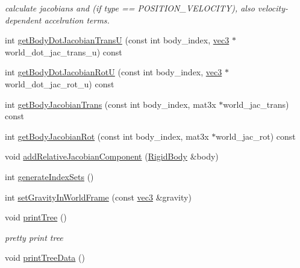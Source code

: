 \begin{CompactItemize}
\begin{CompactList}\small\item\em calculate jacobians and (if type == POSITION\_\-VELOCITY), also velocity-dependent accelration terms. \item\end{CompactList}\item 
int \hyperlink{classbt_inverse_dynamics_1_1_multi_body_tree_1_1_multi_body_impl_3121da37900effff77e309b2c5a2cd16}{getBodyDotJacobianTransU} (const int body\_\-index, \hyperlink{classbt_inverse_dynamics_1_1vec3}{vec3} $\ast$world\_\-dot\_\-jac\_\-trans\_\-u) const 
\item 
int \hyperlink{classbt_inverse_dynamics_1_1_multi_body_tree_1_1_multi_body_impl_dd377929159d3005cb80eb694ebed57e}{getBodyDotJacobianRotU} (const int body\_\-index, \hyperlink{classbt_inverse_dynamics_1_1vec3}{vec3} $\ast$world\_\-dot\_\-jac\_\-rot\_\-u) const 
\item 
int \hyperlink{classbt_inverse_dynamics_1_1_multi_body_tree_1_1_multi_body_impl_de8deee754a4e09bd652920a4e63875c}{getBodyJacobianTrans} (const int body\_\-index, mat3x $\ast$world\_\-jac\_\-trans) const 
\item 
int \hyperlink{classbt_inverse_dynamics_1_1_multi_body_tree_1_1_multi_body_impl_6ad506d2cc78d6184decd005bdabdce7}{getBodyJacobianRot} (const int body\_\-index, mat3x $\ast$world\_\-jac\_\-rot) const 
\item 
void \hyperlink{classbt_inverse_dynamics_1_1_multi_body_tree_1_1_multi_body_impl_6facecec947e6b43378ba20e6b98eea7}{addRelativeJacobianComponent} (\hyperlink{structbt_inverse_dynamics_1_1_rigid_body}{RigidBody} \&body)
\item 
int \hyperlink{classbt_inverse_dynamics_1_1_multi_body_tree_1_1_multi_body_impl_8e65f0c1da65e68e3a482862f3b866c7}{generateIndexSets} ()
\item 
int \hyperlink{classbt_inverse_dynamics_1_1_multi_body_tree_1_1_multi_body_impl_6a9262d27208b099f1753bfb34178686}{setGravityInWorldFrame} (const \hyperlink{classbt_inverse_dynamics_1_1vec3}{vec3} \&gravity)
\item 
\hypertarget{classbt_inverse_dynamics_1_1_multi_body_tree_1_1_multi_body_impl_52b68afe0f3404617e2de19df70a4c5f}{
void \hyperlink{classbt_inverse_dynamics_1_1_multi_body_tree_1_1_multi_body_impl_52b68afe0f3404617e2de19df70a4c5f}{printTree} ()}
\label{classbt_inverse_dynamics_1_1_multi_body_tree_1_1_multi_body_impl_52b68afe0f3404617e2de19df70a4c5f}

\begin{CompactList}\small\item\em pretty print tree \item\end{CompactList}\item 
\hypertarget{classbt_inverse_dynamics_1_1_multi_body_tree_1_1_multi_body_impl_d35f3180deb174def89f4b7bc48c4629}{
void \hyperlink{classbt_inverse_dynamics_1_1_multi_body_tree_1_1_multi_body_impl_d35f3180deb174def89f4b7bc48c4629}{printTreeData} ()}
\label{classbt_inverse_dynamics_1_1_multi_body_tree_1_1_multi_body_impl_d35f3180deb174def89f4b7bc48c4629}


\end{CompactItemize}
